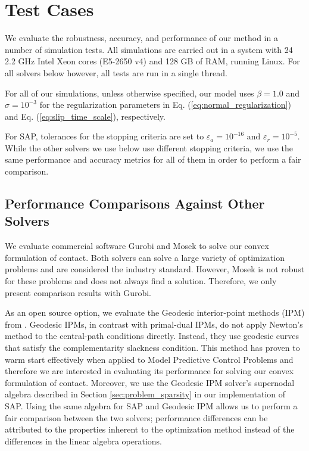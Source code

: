 \section{Test Cases}
\label{sec:test_cases}

We evaluate the robustness, accuracy, and performance of our method in a number
of simulation tests. All simulations are carried out in a system with 24 2.2
GHz Intel Xeon cores (E5-2650 v4) and 128 GB of RAM, running Linux. For all
solvers below however, all tests are run in a single thread.

For all of our simulations, unless otherwise specified, our model uses
$\beta=1.0$ and $\sigma=10^{-3}$ for the regularization parameters in Eq. (\ref{eq:normal_regularization}) and Eq. (\ref{eq:slip_time_scale}), respectively.

For SAP, tolerances for the stopping criteria are set to
$\varepsilon_a=10^{-16}$ and $\varepsilon_r=10^{-5}$. While the other solvers we use below use different stopping criteria, we use the same performance and accuracy metrics for all of them in order to perform a fair comparison.

\subsection{Performance Comparisons Against Other Solvers}
We evaluate commercial software Gurobi and Mosek to solve our convex
formulation of contact. Both solvers can solve a large variety of optimization
problems and are considered the industry standard. However, Mosek is not robust
for these problems and does not always find a solution. Therefore, we only present
comparison results with Gurobi.

As an open source option, we evaluate the Geodesic interior-point methods (IPM)
from \cite{bib:permenter2020}. Geodesic IPMs, in contrast with primal-dual
IPMs, do not apply Newton's method to the central-path conditions directly.
Instead, they use geodesic curves that satisfy the complementarity slackness
condition. This method has proven to warm start effectively when applied to
Model Predictive Control Problems \cite{bib:permenter2020} and therefore we are
interested in evaluating its performance for solving our convex formulation of
contact. Moreover, we use the Geodesic IPM solver's supernodal algebra described
in Section \ref{sec:problem_sparsity} in our implementation of SAP. Using the
same algebra for SAP and Geodesic IPM allows us to perform a fair comparison between
the two solvers; performance differences can be attributed to the properties
inherent to the optimization method instead of the differences in the linear
algebra operations.

